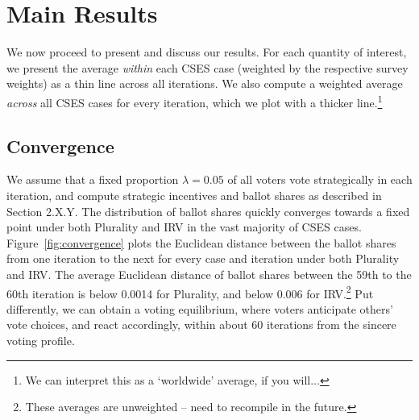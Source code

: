 \documentclass[12pt, letter]{article}
\begin{document}

\section{Main Results}

We now proceed to present and discuss our results. For each quantity of interest, we present the average \emph{within} each CSES case (weighted by the respective survey weights) as a thin line across all iterations. We also compute a weighted average \emph{across} all CSES cases for every iteration, which we plot with a thicker line.\footnote{We can interpret this as a `worldwide' average, if you will...}

\subsection{Convergence}

We assume that a fixed proportion $\lambda = 0.05$ of all voters vote strategically in each iteration, and compute strategic incentives and ballot shares as described in Section 2.X.Y. The distribution of ballot shares quickly converges towards a fixed point under both Plurality and IRV in the vast majority of CSES cases. Figure~\ref{fig:convergence} plots the Euclidean distance between the ballot shares from one iteration to the next for every case and iteration under both Plurality and IRV. The average Euclidean distance of ballot shares between the 59th to the 60th iteration is below 0.0014 for Plurality, and below 0.006 for IRV.\footnote{These averages are unweighted -- need to recompile in the future.} Put differently, we can obtain a voting equilibrium, where voters anticipate others' vote choices, and react accordingly, within about 60 iterations from the sincere voting profile.
\end{document}
